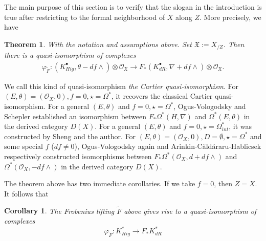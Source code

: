 \documentclass[12pt, a4paper]{article}
\newtheorem{theorem}{Theorem}[section]
\newtheorem{corollary}{Corollary}[section]
\begin{document}
The main purpose of this section is to verify that the slogan in the introduction is true after restricting to the formal neighborhood of $X$ along $Z$. More precisely, we have
\begin{theorem}\label{main thm s2}
With the notation and assumptions above. Set $\mathfrak X:=X_{/Z}$. Then there is a quasi-isomorphism of complexes
\begin{eqnarray}\label{Cartier quasi}
\varphi_{\tilde F}:(K^\bullet_{Hig},\theta-df\wedge)\otimes\mathcal O_{\mathfrak X}\to F_*(K^\bullet_{dR},\nabla+df\wedge)\otimes\mathcal O_{\mathfrak X}.
\end{eqnarray}
\end{theorem}
We call this kind of quasi-isomorphism \emph{the Cartier quasi-isomorphism}. For $(E,\theta)=(\mathcal O_X,0), f=0,\star=\Omega^*$, it recovers the classical Cartier quasi-isomorphism. For a general $(E,\theta)$ and $f=0,\star=\Omega^*$, Ogus-Vologodsky\cite{OV} and Schepler\cite{Schepler} established an isomorphism between $F_*\Omega^*(H,\nabla)$ and $\Omega^*(E,\theta)$ in the derived category $D(X)$. For a general $(E,\theta)$ and $f=0,\star=\Omega^*_{int}$, it was constructed by Sheng and the author\cite{SZ2}. For $(E,\theta)=(\mathcal O_X,0),D=\emptyset,\star=\Omega^*$ and some special $f$ ($df\neq0$), Ogus-Vologodsky\cite{OV} again and Arinkin-C\u{a}ld\u{a}raru-Hablicsek\cite{ACH} respectively constructed isomorphisms between $F_*\Omega^*(\mathcal O_X,d+df\wedge)$ and $\Omega^*(\mathcal O_X,-df\wedge)$ in the derived category $D(X)$.

 The theorem above has two immediate corollaries. If we take $f=0$, then $Z=X$. It follows that
\begin{corollary}
The Frobenius lifting $\tilde F$ above gives rise to a quasi-isomorphism of complexes
$$
\varphi_{\tilde F}:K_{Hig}^*\to F_*K^*_{dR}
$$
\end{corollary}
\end{document}
